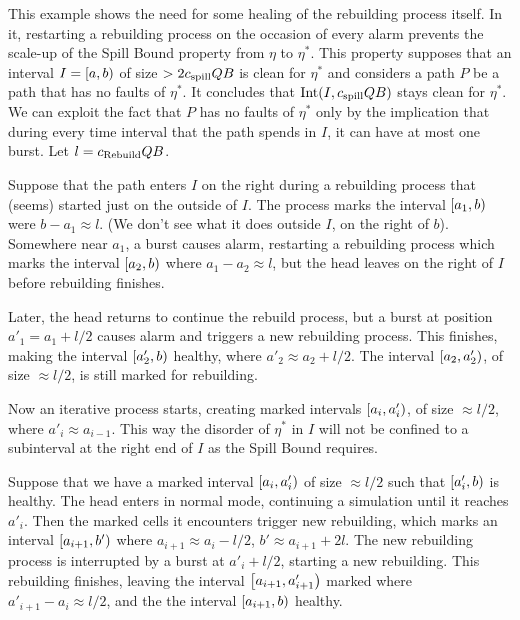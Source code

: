 \documentclass[11pt]{memoir}
\theoremstyle{definition} %
\def\B{B}
\newcommand{\Int}{\mathrm{Int}} %
\newcommand{\Q}{Q} %
\newcommand{\cns}[1]{c_{\textrm{\upshape #1}}}
\newcommand{\CRebuild}{\cns{Rebuild}}
\newcommand{\CSpill}{\cns{spill}}
\begin{document}
\begin{example}\label{xpl:heal-in-rebuild}
  This example shows the need for some healing of the rebuilding process itself.
  In it, restarting a rebuilding process on the occasion of every alarm
  prevents the scale-up of the Spill Bound property from \( \eta \) to \( \eta^{*} \).
  This property supposes that 
  an interval \( I=\left[a,b\right) \) of size \( > 2\CSpill\Q\B \) is clean for \( \eta^{*} \) and considers
  a path \( P \) be a path that has no faults of \( \eta^{*} \).
  It concludes that \( \Int(I,\CSpill\Q\B) \) stays clean for \( \eta^{*} \).
  We can exploit the fact that \( P \) has no faults of \( \eta^{*} \)
  only by the implication that during every time interval
  that the path spends in \( I \), it can have at most one burst.
  Let \( l = \CRebuild\Q\B \).

  Suppose that the path enters \( I \) on the right during a rebuilding process that
  (seems) started just on the outside of \( I \).  
  The process marks the interval \( \left[a_{1},b\right) \) were \( b-a_{1}\approx l \).
  (We don't see what it does outside \( I \), on the right of \( b \)).
  Somewhere near \( a_{1} \), a burst causes alarm, restarting a rebuilding process which
  marks the interval \( \left[a_{2},b\right) \) where \( a_{1}-a_{2}\approx l \),
  but the head leaves on the right of \( I \) before rebuilding finishes.

  Later, the head returns to continue the rebuild process, but a burst at position
  \( a'_{1}=a_{1}+l/2 \) causes alarm and triggers a new rebuilding process.
  This finishes, making the interval \( \left[a'_{2},b\right) \) healthy,
  where \( a'_{2}\approx a_{2}+l/2 \).
  The interval \( \left[a_{2},a'_{2}\right) \), of size \( \approx l/2 \), is still marked for rebuilding.

  Now an iterative process starts, creating marked intervals \( \left[a_{i},a'_{i}\right) \),
  of size \( \approx l/2 \), where \( a'_{i}\approx a_{i-1} \).
  This way the disorder of \( \eta^{*} \) in \( I \) will not be confined to a subinterval
  at the right end of \( I \) as the Spill Bound requires.
  
  Suppose that we have a marked interval \( \left[a_{i},a'_{i}\right) \) of size \( \approx l/2 \)
  such that \( \left[a'_{i},b\right) \) is healthy.
  The head enters in normal mode, continuing a simulation until it reaches \( a'_{i} \).
  Then the marked cells it encounters trigger new rebuilding, which marks an interval
  \( \left[a_{i+1},b'\right) \) where \( a_{i+1}\approx a_{i}-l/2 \), \( b'\approx a_{i+1}+2 l \).
  The new rebuilding process is interrupted by a burst at \( a'_{i}+l/2 \), starting
  a new rebuilding.
  This rebuilding finishes, leaving the interval \( \left[a_{i+1},a'_{i+1}\right) \) marked
  where \( a'_{i+1}-a_{i}\approx l/2 \), and the the interval \( \left[a_{i+1},b\right) \) healthy.
\end{example}
\end{document}
